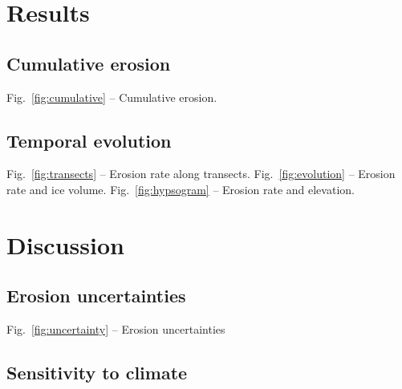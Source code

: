 \documentclass[utf8]{article}
\begin{document}
\section{Results}

\subsection{Cumulative erosion}

    Fig.~\ref{fig:cumulative} -- Cumulative erosion.

\subsection{Temporal evolution}

    Fig.~\ref{fig:transects} -- Erosion rate along transects.
    Fig.~\ref{fig:evolution} -- Erosion rate and ice volume.
    Fig.~\ref{fig:hypsogram} -- Erosion rate and elevation.

\section{Discussion}

\subsection{Erosion uncertainties}

    Fig.~\ref{fig:uncertainty} -- Erosion uncertainties

\subsection{Sensitivity to climate}
\end{document}
